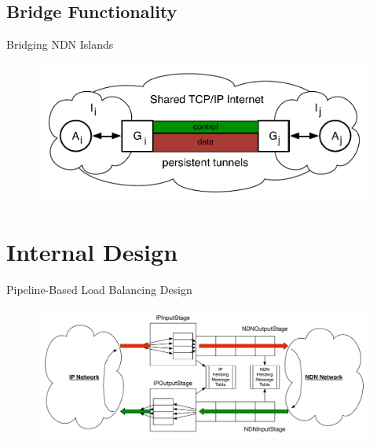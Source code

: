 \documentclass[handout]{beamer}
\begin{document}
\subsection{Bridge Functionality}
\begin{frame}{Bridging NDN Islands}
	\begin{figure}[h]
		\includegraphics[scale=0.5]{img/island_tunnel.pdf}
	\end{figure}
\end{frame}

\section{Internal Design}
\begin{frame}{Pipeline-Based Load Balancing Design}
	\begin{figure}[h]
		\includegraphics[scale=0.37]{img/pipeline.pdf}
	\end{figure}
\end{frame}
\end{document}
